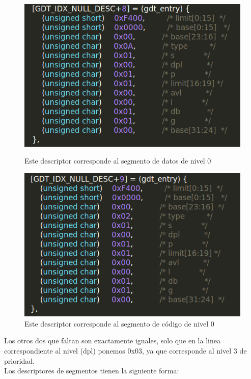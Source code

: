 \begin{figure}[H]
\begin{center}
  \includegraphics[width=\linewidth]{ejercicio1/GDTcodigo0.png}
  \caption{{\small Este descriptor corresponde al segmento de datos de nivel 0}} 
\endminipage
{}
  \includegraphics[width=\linewidth]{ejercicio1/GDTdatos0.png}
  \caption{{\small Este descriptor corresponde al segmento de código de nivel 0}} 
\endminipage
\end{center}
\end{figure}

Los otros dos que faltan son exactamente iguales, solo que en la linea correspondiente al nivel (dpl) ponemos 0x03, ya que corresponde al nivel 3 de prioridad.\\

Los descriptores de segmentos tienen la siguiente forma:
\\

